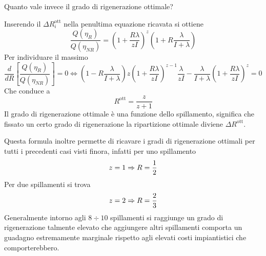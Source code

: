 \begin{adjustwidth}{2in}{}
	Quanto vale invece il grado di rigenerazione ottimale?
	
	Inserendo il $\Delta R_i^\text{ott}$ nella penultima equazione ricavata si ottiene 
	\[\dfrac{Q(\eta_R)}{Q(\eta_{NR})} = \left(1+\dfrac{R\lambda}{zI}\right)^z\left(1+R\dfrac{\lambda}{I+\lambda}\right)\]
	Per individuare il massimo
	\[\dfrac{d}{dR}\left[\dfrac{Q(\eta_R)}{Q(\eta_{NR})}\right] = 0 \Leftrightarrow \left(1-R\dfrac{\lambda}{I+\lambda}\right)z\left(1+\dfrac{R\lambda}{zI}\right)^{z-1}\dfrac{\lambda}{zI} - \dfrac{\lambda}{I+\lambda}\left(1+\dfrac{R\lambda}{zI}\right)^z=0\]
	Che conduce a 
	\[R^\text{ott} = \dfrac{z}{z+1}\]
	Il grado di rigenerazione ottimale è una funzione dello spillamento, significa che fissato un certo grado di rigenerazione la ripartizione ottimale diviene $\Delta R^\text{ott}$. 
	
	Questa formula inoltre permette di ricavare i gradi di rigenerazione ottimali per tutti i precedenti casi visti finora, infatti per uno spillamento 
	\[z = 1 \Rightarrow R = {1\over2}\]
	Per due spillamenti si trova
	\[z = 2 \Rightarrow R = {2\over3}\]
	Generalmente intorno agli $8\div10$ spillamenti si raggiunge un grado di rigenerazione talmente elevato che aggiungere altri spillamenti comporta un guadagno estremamente marginale rispetto agli elevati costi impiantistici che comporterebbero. 	
\end{adjustwidth}





